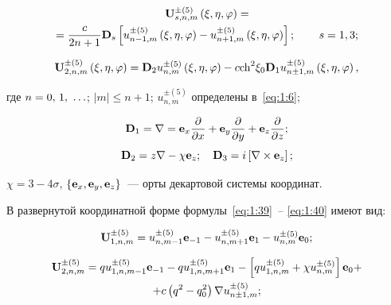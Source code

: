 \begin{multline}\label{eq:1:39}
{\bf{U}}_{s,n,m}^{ \pm (5)}\left( {\xi ,\eta ,\varphi } \right) = \\
= \frac{c}{{2n + 1}}{{\bf{D}}_s}\left[ {u_{n - 1,m}^{ \pm (5)}\left( {\xi ,\eta ,\varphi } \right) - u_{n + 1,m}^{ \pm (5)}\left( {\xi ,\eta ,\varphi } \right)} \right];\qquad {\kern 1pt} s = 1,3;
\end{multline}

\begin{equation}\label{eq:1:40}
{\bf{U}}_{2,n,m}^{ \pm (5)}\left( {\xi ,\eta ,\varphi } \right) = {{\bf{D}}_2}u_{n,m}^{ \pm (5)}\left( {\xi ,\eta ,\varphi } \right) - c{{\mathop{\rm ch}\nolimits} ^2}{\xi _0}{{\bf{D}}_1}u_{n \pm 1,m}^{ \pm (5)}\left( {\xi ,\eta ,\varphi } \right),
\end{equation}

\noindent где $n = 0,{\mkern 1mu} {\kern 1pt} 1,{\mkern 1mu} {\kern 1pt}  \ldots $; $|m| \le n + 1$; $u_{n,m}^{ \pm (5)}$ определены в~\eqref{eq:1:6};

\begin{equation*}
{{\bf{D}}_1} = \nabla  = {{\bf{e}}_x}\frac{\partial }{{\partial x}} + {{\bf{e}}_y}\frac{\partial }{{\partial y}} + {{\bf{e}}_z}\frac{\partial }{{\partial z}};
\end{equation*}
\begin{equation}\label{eq:1:41}
{{\bf{D}}_2} = z\nabla  - \chi {{\bf{e}}_z};\quad {{\bf{D}}_3} = i\left[ {\nabla  \times {{\bf{e}}_z}} \right];
\end{equation}

\noindent $\chi  = 3 - 4\sigma $, $\left\{ {{{\bf{e}}_x},{{\bf{e}}_y},{{\bf{e}}_z}} \right\}$~--- орты декартовой системы координат.

В развернутой координатной форме формулы~\eqref{eq:1:39}~-- \eqref{eq:1:40} имеют вид:

\begin{equation}\label{eq:1:42}
{\bf{U}}_{1,n,m}^{ \pm (5)} = u_{n,m - 1}^{ \pm (5)}{{\bf{e}}_{ - 1}} - u_{n,m + 1}^{ \pm (5)}{{\bf{e}}_1} - u_{n,m}^{ \pm (5)}{{\bf{e}}_0};
\end{equation}

\begin{multline}\label{eq:1:43}
{\bf{U}}_{2,n,m}^{ \pm (5)} = qu_{1,n,m - 1}^{ \pm (5)}{{\bf{e}}_{ - 1}} - qu_{1,n,m + 1}^{ \pm (5)}{{\bf{e}}_1} - \left[ {qu_{1,n,m}^{ \pm (5)} + \chi u_{n,m}^{ \pm (5)}} \right]{{\bf{e}}_0} + \\
+ c\left( {{q^2} - q_0^2} \right)\nabla u_{n \pm 1,m}^{ \pm (5)};
\end{multline}

